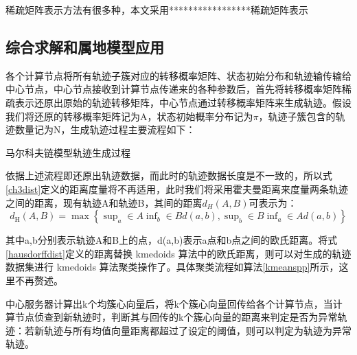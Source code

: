 稀疏矩阵表示方法有很多种，本文采用*****************稀疏矩阵表示


\subsection{综合求解和属地模型应用}
各个计算节点将所有轨迹子簇对应的转移概率矩阵、状态初始分布和轨迹输传输给中心节点，中心节点接收到计算节点传递来的各种参数后，首先将转移概率矩阵稀疏表示还原出原始的轨迹转移矩阵，中心节点通过转移概率矩阵来生成轨迹。假设我们将还原的转移概率矩阵记为A，状态初始概率分布记为$\pi$，轨迹子簇包含的轨迹数量记为N，生成轨迹过程主要流程如下：\\
\begin{algorithm}[H]
	 \caption{马尔科夫链模型轨迹生成过程}
\end{algorithm}

依据上述流程即还原出轨迹数据，而此时的轨迹数据长度是不一致的，所以式\ref{ch3dist}定义的距离度量将不再适用，此时我们将采用霍夫曼距离来度量两条轨迹之间的距离，现有轨迹A和轨迹B，其间的距离$d_H(A,B)$可表示为：
\begin{equation}
\label{hausdorffdist}
d_{\text{H}}\left( A,B \right) =\max \left\{ \mathop{\text{sup}}_a\in A\mathop{\text{inf}}_b\in Bd\left( a,b \right) ,\mathop{\text{sup}}_b\in B\mathop{\text{inf}}_a\in Ad\left( a,b \right) \right\} 
\end{equation}

其中a,b分别表示轨迹A和B上的点，d(a,b)表示a点和b点之间的欧氏距离。将式\ref{hausdorffdist}定义的距离替换 kmedoids 算法中的欧氏距离，则可以对生成的轨迹数据集进行 kmedoids 算法聚类操作了。具体聚类流程如算法\ref{kmeanspp}所示，这里不再赘述。


中心服务器计算出k个均簇心向量后，将k个簇心向量回传给各个计算节点，当计算节点侦查到新轨迹时，判断其与回传的k个簇心向量的距离来判定是否为异常轨迹：若新轨迹与所有均值向量距离都超过了设定的阈值，则可以判定为轨迹为异常轨迹。


